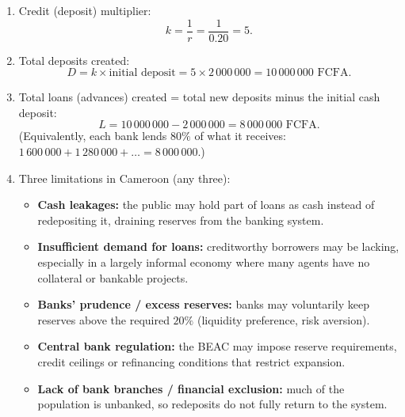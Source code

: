 \documentclass[11pt]{article}
\newcommand{\cle}[1]{{\popxbold\color{popdark}#1}}
\begin{document}
\begin{corrige}
\begin{enumerate}
\item \cle{Credit (deposit) multiplier}:
\[ k = \frac{1}{r} = \frac{1}{0.20} = 5. \]
\item Total deposits created:
\[ D = k \times \text{initial deposit} = 5 \times 2\,000\,000 = 10\,000\,000 \text{ FCFA}. \]
\item Total loans (advances) created = total new deposits minus the initial cash deposit:
\[ L = 10\,000\,000 - 2\,000\,000 = 8\,000\,000 \text{ FCFA}. \]
(Equivalently, each bank lends $80\%$ of what it receives: $1\,600\,000 + 1\,280\,000 + \dots = 8\,000\,000$.)
\item Three limitations in Cameroon (any three):
\begin{itemize}
\item \textbf{Cash leakages:} the public may hold part of loans as cash instead of redepositing it, draining reserves from the banking system.
\item \textbf{Insufficient demand for loans:} creditworthy borrowers may be lacking, especially in a largely informal economy where many agents have no collateral or bankable projects.
\item \textbf{Banks' prudence / excess reserves:} banks may voluntarily keep reserves above the required $20\%$ (liquidity preference, risk aversion).
\item \textbf{Central bank regulation:} the BEAC may impose reserve requirements, credit ceilings or refinancing conditions that restrict expansion.
\item \textbf{Lack of bank branches / financial exclusion:} much of the population is unbanked, so redeposits do not fully return to the system.
\end{itemize}
\end{enumerate}
\end{corrige}
\end{document}
